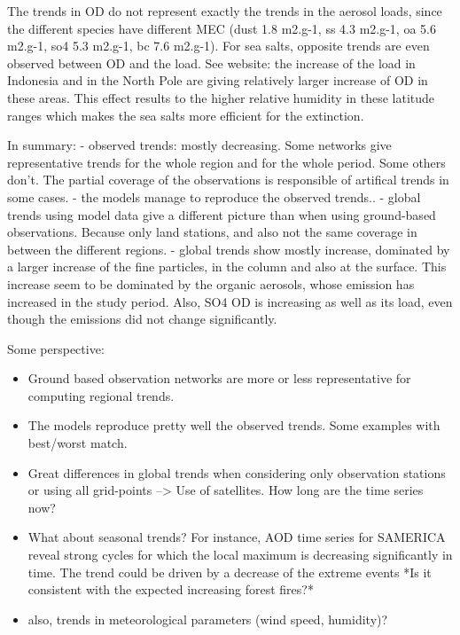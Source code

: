 \documentclass[journal abbreviation, manuscript]{copernicus}
\begin{document}
The trends in OD do not represent exactly the trends in the aerosol loads, since the different species have different MEC (dust 1.8 m2.g-1, ss 4.3 m2.g-1, oa 5.6 m2.g-1, so4 5.3 m2.g-1, bc 7.6 m2.g-1). For sea salts, opposite trends are even observed between OD and the load. See website: the increase of the load in Indonesia and in the North Pole are giving relatively larger increase of OD in these areas. This effect results to the higher relative humidity in these latitude ranges which makes the sea salts more efficient for the extinction.


\conclusions  %
In summary:
- observed trends: mostly decreasing. Some networks give representative trends for the whole region and for the whole period. Some others don't. The partial coverage of the observations is responsible of artifical trends in some cases.
- the models manage to reproduce the observed trends..
- global trends using model data give a different picture than when using ground-based observations. Because only land stations, and also not the same coverage in between the different regions.
- global trends show mostly increase, dominated by a larger increase of the fine particles, in the column and also at the surface. This increase seem to be dominated by the organic aerosols, whose emission has increased in the study period. Also, SO4 OD is increasing as well as its load, even though the emissions did not change significantly.

Some perspective:
\begin{itemize}
 \item Ground based observation networks are more or less representative for computing regional trends.
 \item The models reproduce pretty well the observed trends. Some examples with best/worst match.
 \item Great differences in global trends when considering only observation stations or using all grid-points --> Use of satellites. How long are the time series now?
 \item What about seasonal trends? For instance, AOD time series for SAMERICA reveal strong cycles for which the local maximum is decreasing significantly in time. The trend could be driven by a decrease of the extreme events *Is it consistent with the expected increasing forest fires?*
 \item also, trends in meteorological parameters (wind speed, humidity)?
\end{itemize}
\end{document}
